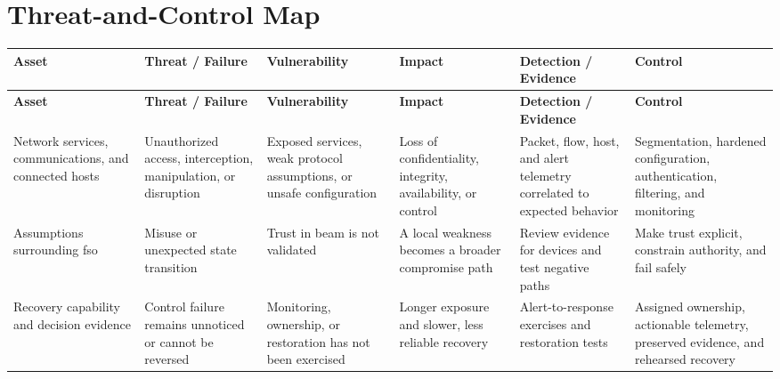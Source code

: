 \documentclass[11pt,letterpaper]{article}
\begin{document}
\section*{Threat-and-Control Map}
\begingroup\scriptsize\setlength{\tabcolsep}{2pt}
\begin{longtable}{>{\raggedright\arraybackslash}p{}>{\raggedright\arraybackslash}p{}>{\raggedright\arraybackslash}p{}>{\raggedright\arraybackslash}p{}>{\raggedright\arraybackslash}p{}>{\raggedright\arraybackslash}p{}}
\toprule\rowcolor{Navy}\color{white}\textbf{Asset} & \color{white}\textbf{Threat / Failure} & \color{white}\textbf{Vulnerability} & \color{white}\textbf{Impact} & \color{white}\textbf{Detection / Evidence} & \color{white}\textbf{Control}\\\midrule
\endfirsthead
\toprule\rowcolor{Navy}\color{white}\textbf{Asset} & \color{white}\textbf{Threat / Failure} & \color{white}\textbf{Vulnerability} & \color{white}\textbf{Impact} & \color{white}\textbf{Detection / Evidence} & \color{white}\textbf{Control}\\\midrule
\endhead
Network services, communications, and connected hosts & Unauthorized access, interception, manipulation, or disruption & Exposed services, weak protocol assumptions, or unsafe configuration & Loss of confidentiality, integrity, availability, or control & Packet, flow, host, and alert telemetry correlated to expected behavior & Segmentation, hardened configuration, authentication, filtering, and monitoring\\\midrule
Assumptions surrounding fso & Misuse or unexpected state transition & Trust in beam is not validated & A local weakness becomes a broader compromise path & Review evidence for devices and test negative paths & Make trust explicit, constrain authority, and fail safely\\\midrule
Recovery capability and decision evidence & Control failure remains unnoticed or cannot be reversed & Monitoring, ownership, or restoration has not been exercised & Longer exposure and slower, less reliable recovery & Alert-to-response exercises and restoration tests & Assigned ownership, actionable telemetry, preserved evidence, and rehearsed recovery\\\midrule
\bottomrule
\end{longtable}
\endgroup
\end{document}
